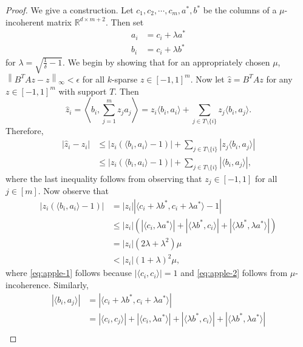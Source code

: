 \documentclass[10pt,a4paper]{amsart}
\newcommand{\RR}{\mathbb{R}}
\newcommand{\norm}[1]{\left\|#1\right\|}
\begin{document}
\begin{proof}
    We give a construction. Let $c_1,c_2,\cdots,c_m,a^*,b^*$ be the columns of a $\mu$-incoherent matrix $\RR^{d\times m+2}$. Then set
    \begin{align}
        a_i &= c_i + \lambda a^*\\
        b_i &= c_i + \lambda b^*
    \end{align}
    for $\lambda = \sqrt{\frac{1}{\delta} - 1}.$
    We begin by showing that for an appropriately chosen $\mu$, $\norm{B^TAz - z}_\infty < \epsilon$ for all $k$-sparse $z\in [-1,1]^m.$ Now let $\hat{z} = B^TAz$ for any $z\in [-1,1]^m$ with support $T$. Then
    \begin{equation}
        \hat{z}_i = \left\langle b_i, \sum_{j=1}^m z_ja_j \right\rangle
        = z_i\langle b_i, a_i\rangle + \sum_{j\in T\setminus \{i\}} z_j\langle b_i, a_j\rangle.
    \end{equation}
    Therefore,
    \begin{align}
        |\hat{z}_i - z_i| &\le |z_i(\langle b_i, a_i\rangle - 1)| + \sum_{j\in T\setminus \{i\}} |z_j\langle b_i, a_j\rangle|\\
        &\le |z_i(\langle b_i, a_i \rangle - 1)| + \sum_{j\in T\setminus \{i\}} |\langle b_i, a_j\rangle|,
    \end{align}
    where the last inequality follows from observing that $z_j \in [-1,1]$ for all $j\in [m].$ Now observe that
    \begin{align}
        |z_i(\langle b_i, a_i\rangle - 1)| &= |z_i||\langle c_i + \lambda b^*, c_i + \lambda a^*\rangle - 1|\\
        &\le |z_i|\left(|\langle c_i, \lambda a^*\rangle| + |\langle \lambda b^*, c_i \rangle| + |\langle \lambda b^*, \lambda a^* \rangle|\right) \label{eq:apple-1}\\
        &= |z_i|(2\lambda  + \lambda^2)\mu\label{eq:apple-2}\\
        &< |z_i|(1 + \lambda)^2\mu,
    \end{align}
    where \eqref{eq:apple-1} follows because $|\langle c_i, c_i \rangle| = 1$ and \eqref{eq:apple-2} follows from $\mu$-incoherence. Similarly,
    \begin{align}
        |\langle b_i, a_j\rangle| &= |\langle c_i + \lambda b^*, c_i + \lambda a^*\rangle|\\
        &= |\langle c_i, c_j\rangle| + |\langle c_i, \lambda a^*\rangle| + |\langle \lambda b^*, c_i \rangle| + |\langle \lambda b^*, \lambda a^* \rangle|\\

\end{align}
\end{proof}
\end{document}
